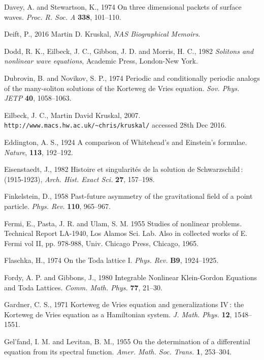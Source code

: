 \documentclass[11pt]{article}
\begin{document}
\begin{thebibliography}{30}
Davey, A. and Stewartson, K., 1974 On three dimensional packets of surface waves. \textit{Proc. R. Soc. A}  \textbf{338}, 101--110.

 Deift, P., 2016 Martin D. Kruskal, \textit{NAS Biographical Memoirs}. 

 Dodd, R. K., Eilbeck, J. C., Gibbon, J. D. and Morris, H. C., 1982 \textit{Solitons and nonlinear wave equations}, Academic Press, London-New York.

 Dubrovin, B. and Novikov, S. P., 1974 Periodic and conditionally periodic analogs of the many-soliton solutions 
of the Korteweg de Vries equation. \textit{Sov. Phys. JETP} \textbf{40}, 1058--1063.

 Eilbeck, J. C., Martin David Kruskal, 2007. \verb+http://www.macs.hw.ac.uk/~chris/kruskal/+ accessed 
28th Dec 2016.

 Eddington, A. S.,  1924 A comparison of Whitehead's and Einstein's formulae. \textit{Nature}, \textbf{113}, 
192--192. 

 Eisenstaedt, J., 1982 Histoire et singularit\'es de la solution de Schwarzschild\,: (1915-1923), \textit{Arch. Hist. Exact Sci.} \textbf{27}, 157--198.

 Finkelstein, D., 1958 Past-future asymmetry of the gravitational field of a point particle. \textit{Phys. Rev.} \textbf{110}, 965--967.

 Fermi, E., Pasta, J. R. and Ulam, S. M. 1955 Studies of nonlinear problems. Technical Report LA-1940, 
Los Alamos Sci. Lab.  Also in collected works of E. Fermi vol II, pp. 978-988, Univ. Chicago Press, Chicago, 1965.

 Flaschka, H., 1974 On the Toda lattice I. \textit{Phys. Rev.} \textbf{B9}, 1924--1925.

 Fordy, A. P. and Gibbons, J., 1980 Integrable Nonlinear Klein-Gordon Equations and Toda Lattices. 
\textit{Comm. Math. Phys.} \textbf{77}, 21--30.

 Gardner, C. S., 1971 Korteweg de Vries equation and generalizations IV\,: the Korteweg de Vries 
equation as a Hamiltonian system. \textit{J. Math. Phys.} \textbf{12}, 1548--1551. 

 Gel'fand, I. M. and Levitan, B. M., 1955 On the determination of a differential equation from its 
spectral function. \textit{Amer. Math. Soc. Trans.} \textbf{1}, 253--304. 


\end{thebibliography}
\end{document}
